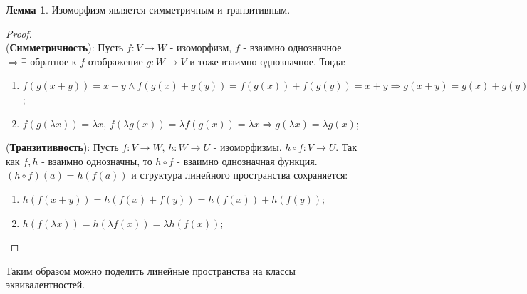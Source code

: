 \documentclass[12pt]{article}
\theoremstyle{definition}
\newtheorem{lemma}{Лемма}
\begin{document}
\begin{lemma}
	Изоморфизм является симметричным и транзитивным.
\end{lemma}
\begin{proof}\hfill\\
	(\textbf{Симметричность}): Пусть $f \colon V \to W$ - изоморфизм, $f$ - взаимно однозначное $\Rightarrow \exists$ обратное к $f$ отображение $g \colon W \to V$ и тоже взаимно однозначное. 
	Тогда:
	\begin{enumerate}[label ={(\arabic*)}]
		\item $f(g(x+y)) = x+y \wedge f(g(x) + g(y)) = f(g(x)) + f(g(y)) = x + y \Rightarrow g(x+y) = g(x) + g(y)$;
		\item $f(g(\lambda x)) = \lambda x, \, f(\lambda g(x)) = \lambda f(g(x)) = \lambda x \Rightarrow g(\lambda x) = \lambda g(x)$;
	\end{enumerate}	

	(\textbf{Транзитивность}): Пусть $f\colon V \to W, \, h\colon W \to U$ - изоморфизмы. $h \circ f \colon V \to U$. Так как $f,h$ - взаимно однозначны, то $h \circ f$ - взаимно однозначная функция. $(h \circ f)(a) = h(f(a))$ и структура линейного пространства сохраняется:
	\begin{enumerate}[label ={(\arabic*)}]
		\item $h(f(x+y)) = h(f(x) + f(y)) = h(f(x)) + h(f(y))$;
		\item $h(f(\lambda x)) = h(\lambda f(x)) = \lambda h(f(x))$;
	\end{enumerate}
\end{proof}
Таким образом можно поделить линейные пространства на классы эквивалентностей.
\end{document}
